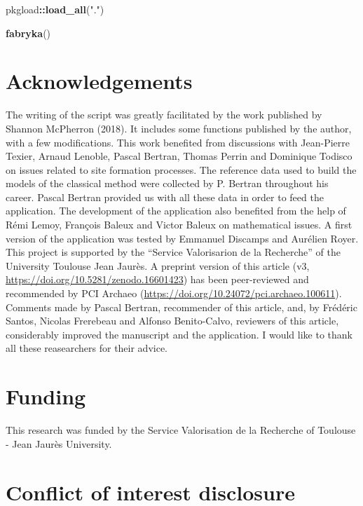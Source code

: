 \documentclass[
]{article}
\newenvironment{Shaded}{\begin{snugshade}}{\end{snugshade}}
\newcommand{\FunctionTok}[1]{\textcolor[rgb]{0.13,0.29,0.53}{\textbf{#1}}}
\newcommand{\NormalTok}[1]{#1}
\newcommand{\SpecialCharTok}[1]{\textcolor[rgb]{0.81,0.36,0.00}{\textbf{#1}}}
\newcommand{\StringTok}[1]{\textcolor[rgb]{0.31,0.60,0.02}{#1}}
\begin{document}
\begin{Shaded}
\begin{Highlighting}[]
\NormalTok{pkgload}\SpecialCharTok{::}\FunctionTok{load\_all}\NormalTok{(}\StringTok{"."}\NormalTok{)}

\FunctionTok{fabryka}\NormalTok{()}
\end{Highlighting}
\end{Shaded}

\section{Acknowledgements}\label{acknowledgements}

The writing of the script was greatly facilitated by the work published
by Shannon McPherron (2018). It includes some functions published by the
author, with a few modifications. This work benefited from discussions
with Jean-Pierre Texier, Arnaud Lenoble, Pascal Bertran, Thomas Perrin
and Dominique Todisco on issues related to site formation processes. The
reference data used to build the models of the classical method were
collected by P. Bertran throughout his career. Pascal Bertran provided
us with all these data in order to feed the application. The development
of the application also benefited from the help of Rémi Lemoy, François
Baleux and Victor Baleux on mathematical issues. A first version of the
application was tested by Emmanuel Discamps and Aurélien Royer. This
project is supported by the ``Service Valorisarion de la Recherche'' of
the University Toulouse Jean Jaurès. A preprint version of this article
(v3, \url{https://doi.org/10.5281/zenodo.16601423}) has been
peer-reviewed and recommended by PCI Archaeo
(\url{https://doi.org/10.24072/pci.archaeo.100611}). Comments made by
Pascal Bertran, recommender of this article, and, by Frédéric Santos,
Nicolas Frerebeau and Alfonso Benito-Calvo, reviewers of this article,
considerably improved the manuscript and the application. I would like
to thank all these reasearchers for their advice. \bigbreak

\section{Funding}\label{funding}

This research was funded by the Service Valorisation de la Recherche of
Toulouse - Jean Jaurès University. \bigbreak

\section{Conflict of interest
disclosure}\label{conflict-of-interest-disclosure}
\end{document}
